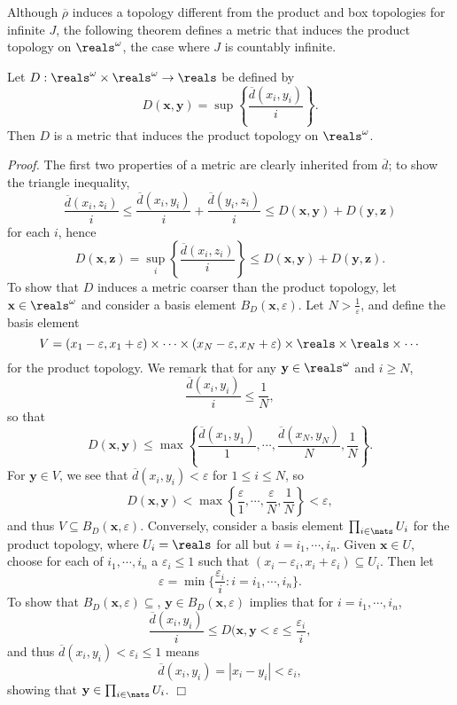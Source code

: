 Although $\overline{\rho}$ induces a topology different from the product and box topologies for infinite $J$, the following theorem defines a metric that induces the product topology on $\reals^\omega$, the case where $J$ is countably infinite.
\begin{theorem}\label{2.63}
    Let $D: \reals^\omega \times \reals^\omega \rightarrow \reals$ be defined by
    $$D(\mathbf{x}, \mathbf{y}) = \sup \left\{ \frac{\overline{d}(x_i, y_i)}{i} \right\}.$$
    Then $D$ is a metric that induces the product topology on $\reals^\omega$.
\end{theorem}
{\it Proof.} The first two properties of a metric are clearly inherited from $\overline{d}$; to show the triangle inequality,
$$\frac{\overline{d}(x_i, z_i)}{i} \leq \frac{\overline{d}(x_i, y_i)}{i} + \frac{\overline{d}(y_i, z_i)}{i} \leq D(\mathbf{x}, \mathbf{y}) + D(\mathbf{y}, \mathbf{z})$$
for each $i$, hence
$$D(\mathbf{x}, \mathbf{z}) = \sup_i \left\{\frac{\overline{d}(x_i, z_i)}{i}\right\} \leq D(\mathbf{x}, \mathbf{y}) + D(\mathbf{y}, \mathbf{z}).$$
To show that $D$ induces a metric coarser than the product topology, let $\mathbf{x} \in \reals^\omega$ and consider a basis element $B_D(\mathbf{x}, \varepsilon)$. Let $N > \frac{1}{\varepsilon}$, and define the basis element
$$V = (x_1 - \varepsilon, x_1 + \varepsilon) \times \cdots \times (x_N - \varepsilon, x_N + \varepsilon) \times \reals \times \reals \times \cdots$$
for the product topology. We remark that for any $\mathbf{y} \in \reals^\omega$ and $i \geq N$,
$$\frac{\overline{d}(x_i, y_i)}{i} \leq \frac{1}{N},$$
so that
$$D(\mathbf{x}, \mathbf{y}) \leq \max \left\{ \frac{\overline{d}(x_1, y_1)}{1}, \cdots, \frac{\overline{d}(x_N, y_N)}{N}, \frac1N \right\}.$$
For $\mathbf{y} \in V$, we see that $\overline{d}(x_i, y_i) < \varepsilon$ for $1 \leq i \leq N$, so
$$D(\mathbf{x}, \mathbf{y}) < \max \left\{ \frac{\varepsilon}{1}, \cdots, \frac{\varepsilon}{N}, \frac1N \right\} < \varepsilon,$$
and thus $V \subseteq B_D(\mathbf{x}, \varepsilon)$. Conversely, consider a basis element $\prod_{i \in \nats} U_i$ for the product topology, where $U_i = \reals$ for all but $i = i_1, \cdots, i_n$. Given $\mathbf{x} \in U$, choose for each of $i_1, \cdots, i_n$ a $\varepsilon_i \leq 1$ such that $(x_i - \varepsilon_i, x_i + \varepsilon_i) \subseteq U_i$. Then let
$$\varepsilon = \min\{\frac{\varepsilon_i}{i}: i = i_1, \cdots, i_n\}.$$
To show that $B_D(\mathbf{x}, \varepsilon) \subseteq$, $\mathbf{y} \in B_D(\mathbf{x}, \varepsilon)$ implies that for $i = i_1, \cdots, i_n$,
$$\frac{\overline{d}(x_i, y_i)}{i} \leq D(\mathbf{x}, \mathbf{y} < \varepsilon \leq \frac{\varepsilon_i}{i},$$
and thus $\overline{d}(x_i, y_i) < \varepsilon_i \leq 1$ means 
$$\overline{d}(x_i, y_i) = |x_i - y_i| < \varepsilon_i,$$
showing that $\mathbf{y} \in \prod_{i \in \nats} U_i$. $\Box$

